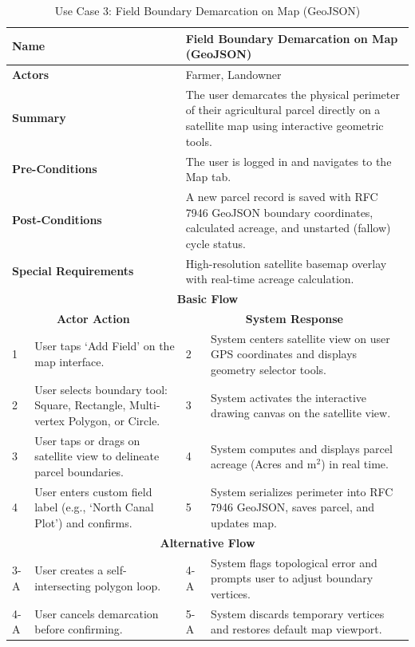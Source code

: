 \begin{table}[H]
\small
\centering
\caption{Use Case 3: Field Boundary Demarcation on Map (GeoJSON)}
\label{tab:uc3}
\begin{tabular}{|p{0.6cm}|p{6.4cm}|p{0.8cm}|p{6.6cm}|}
\hline
\multicolumn{2}{|p{7.0cm}|}{\textbf{Name}} & \multicolumn{2}{p{7.4cm}|}{Field Boundary Demarcation on Map (GeoJSON)} \\ \hline
\multicolumn{2}{|p{7.0cm}|}{\textbf{Actors}} & \multicolumn{2}{p{7.4cm}|}{Farmer, Landowner} \\ \hline
\multicolumn{2}{|p{7.0cm}|}{\textbf{Summary}} & \multicolumn{2}{p{7.4cm}|}{The user demarcates the physical perimeter of their agricultural parcel directly on a satellite map using interactive geometric tools.} \\ \hline
\multicolumn{2}{|p{7.0cm}|}{\textbf{Pre-Conditions}} & \multicolumn{2}{p{7.4cm}|}{The user is logged in and navigates to the Map tab.} \\ \hline
\multicolumn{2}{|p{7.0cm}|}{\textbf{Post-Conditions}} & \multicolumn{2}{p{7.4cm}|}{A new parcel record is saved with RFC 7946 GeoJSON boundary coordinates, calculated acreage, and unstarted (fallow) cycle status.} \\ \hline
\multicolumn{2}{|p{7.0cm}|}{\textbf{Special Requirements}} & \multicolumn{2}{p{7.4cm}|}{High-resolution satellite basemap overlay with real-time acreage calculation.} \\ \hline
\multicolumn{4}{|c|}{\textbf{Basic Flow}} \\ \hline
\multicolumn{2}{|c|}{\textbf{Actor Action}} & \multicolumn{2}{c|}{\textbf{System Response}} \\ \hline
1 & User taps `Add Field' on the map interface. & 2 & System centers satellite view on user GPS coordinates and displays geometry selector tools. \\ \hline
2 & User selects boundary tool: Square, Rectangle, Multi-vertex Polygon, or Circle. & 3 & System activates the interactive drawing canvas on the satellite view. \\ \hline
3 & User taps or drags on satellite view to delineate parcel boundaries. & 4 & System computes and displays parcel acreage (Acres and $\text{m}^2$) in real time. \\ \hline
4 & User enters custom field label (e.g., `North Canal Plot') and confirms. & 5 & System serializes perimeter into RFC 7946 GeoJSON, saves parcel, and updates map. \\ \hline
\multicolumn{4}{|c|}{\textbf{Alternative Flow}} \\ \hline
3-A & User creates a self-intersecting polygon loop. & 4-A & System flags topological error and prompts user to adjust boundary vertices. \\ \hline
4-A & User cancels demarcation before confirming. & 5-A & System discards temporary vertices and restores default map viewport. \\ \hline
\end{tabular}
\end{table}

